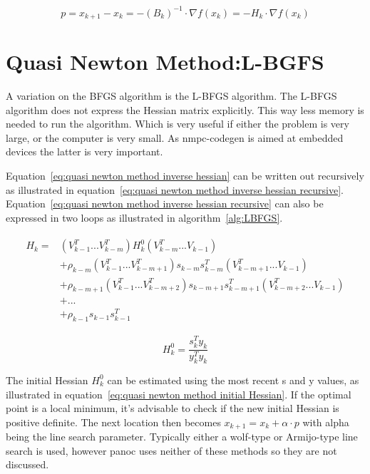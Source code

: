 		\begin{equation}
		p = x_{k+1}-x_k = -(B_k)^{-1} \cdot \nabla f(x_k) = -H_k\cdot \nabla f(x_k)
		\label{eq:quasi newton method}	
		\end{equation}
		
	\section{Quasi Newton Method:L-BGFS}
	A variation on the BFGS algorithm is the L-BFGS algorithm. The L-BFGS algorithm does not express the Hessian matrix explicitly. This way less memory is needed to run the algorithm. Which is very useful if either the problem is very large, or the computer is very small. As nmpc-codegen is aimed at embedded devices the latter is very important.
	
	Equation~\ref{eq:quasi newton method inverse hessian} can be written out recursively as illustrated in equation~\ref{eq:quasi newton method inverse hessian recursive}. Equation~\ref{eq:quasi newton method inverse hessian recursive} can also be expressed in two loops as illustrated in algorithm~\ref{alg:LBFGS}.
	
		\begin{eqnarray}	 
			\begin{aligned}
				H_k = 
				& (V^T_{k-1} ... V^T_{k-m})H^0_k(V^T_{k-m} ... V_{k-1}) \\
				& + \rho_{k-m} (V^T_{k-1} ... V^T_{k-m+1})s_{k-m}s_{k-m}^T(V^T_{k-m+1} ... V_{k-1}) \\
				& + \rho_{k-m+1} (V^T_{k-1} ... V^T_{k-m+2})s_{k-m+1}s_{k-m+1}^T(V^T_{k-m+2} ... V_{k-1}) \\
				& + ... \\
				& + \rho_{k-1}s_{k-1}s_{k-1}^T
			\end{aligned}
			\label{eq:quasi newton method inverse hessian recursive}
		\end{eqnarray}
		
		\begin{equation}
			H_k^0 = \frac{s_k^Ty_k}{y_k^Ty_k}
			\label{eq:quasi newton method initial Hessian}
		\end{equation}
		
	The initial Hessian $H^0_k$ can be estimated using the most recent s and y values, as illustrated in equation~\ref{eq:quasi newton method initial Hessian}. If the optimal point is a local minimum, it's advisable to check if the new initial Hessian is positive definite. The next location then becomes $x_{k+1} = x_{k}+ \alpha \cdot p$ with alpha being the line search parameter. Typically either a wolf-type or Armijo-type line search is used, however panoc uses neither of these methods so they are not discussed.
	
